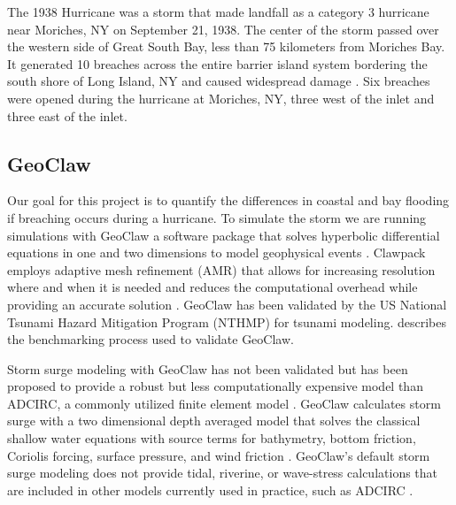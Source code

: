 \documentclass{coastal_paper}
\begin{document}
The 1938 Hurricane was a storm that made landfall as a category 3 hurricane near Moriches, NY on September 21, 1938. The center of the storm passed over the western side of Great South Bay, less than 75 kilometers from Moriches Bay. It generated 10 breaches across the entire barrier island system bordering the south shore of Long Island, NY and caused widespread damage \citep{morang1999shinnecock, coch1994hurricane, Canizares2008}. Six breaches were opened during the hurricane at Moriches, NY, three west of the inlet and three east of the inlet. 

\subsection{GeoClaw}
Our goal for this project is to quantify the differences in coastal and bay flooding if breaching occurs during a hurricane. To simulate the storm we are running simulations with GeoClaw a software package that solves hyperbolic differential equations in one and two dimensions to model geophysical events \citep{clawpack, mandli2016clawpack}. Clawpack employs adaptive mesh refinement (AMR) that allows for increasing resolution where and when it is needed and reduces the computational overhead while providing an accurate solution \citep{Berger2011TheRefinement}. GeoClaw has been validated by the US National Tsunami Hazard Mitigation Program (NTHMP) for tsunami modeling. \citep{gonzalez2011validation} describes the benchmarking process used to validate GeoClaw. 

Storm surge modeling with GeoClaw has not been validated but has been proposed to provide a robust but less computationally expensive model than ADCIRC, a commonly utilized finite element model \citep{Westerink2008, Mandli2014}. GeoClaw calculates storm surge with a two dimensional depth averaged model that solves the classical shallow water equations with source terms for bathymetry, bottom friction, Coriolis forcing, surface pressure, and wind friction \citep{Mandli2014}. GeoClaw's default storm surge modeling does not provide tidal, riverine, or wave-stress calculations that are included in other models currently used in practice, such as ADCIRC \citep{Westerink2008, Mandli2014}.
\end{document}
